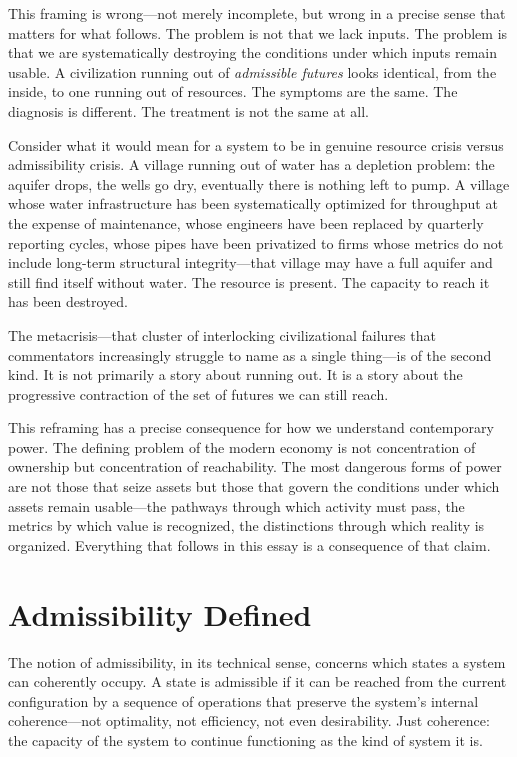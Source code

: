 \documentclass[11pt, letterpaper]{article}
\begin{document}
This framing is wrong---not merely incomplete, but wrong in a precise sense that matters for what follows. The problem is not that we lack inputs. The problem is that we are systematically destroying the conditions under which inputs remain usable. A civilization running out of \emph{admissible futures} looks identical, from the inside, to one running out of resources. The symptoms are the same. The diagnosis is different. The treatment is not the same at all.

Consider what it would mean for a system to be in genuine resource crisis versus admissibility crisis. A village running out of water has a depletion problem: the aquifer drops, the wells go dry, eventually there is nothing left to pump. A village whose water infrastructure has been systematically optimized for throughput at the expense of maintenance, whose engineers have been replaced by quarterly reporting cycles, whose pipes have been privatized to firms whose metrics do not include long-term structural integrity---that village may have a full aquifer and still find itself without water. The resource is present. The capacity to reach it has been destroyed.

The metacrisis---that cluster of interlocking civilizational failures that commentators increasingly struggle to name as a single thing---is of the second kind. It is not primarily a story about running out. It is a story about the progressive contraction of the set of futures we can still reach.

This reframing has a precise consequence for how we understand contemporary power. The defining problem of the modern economy is not concentration of ownership but concentration of reachability. The most dangerous forms of power are not those that seize assets but those that govern the conditions under which assets remain usable---the pathways through which activity must pass, the metrics by which value is recognized, the distinctions through which reality is organized. Everything that follows in this essay is a consequence of that claim.

\section{Admissibility Defined}

The notion of admissibility, in its technical sense, concerns which states a system can coherently occupy. A state is admissible if it can be reached from the current configuration by a sequence of operations that preserve the system's internal coherence---not optimality, not efficiency, not even desirability. Just coherence: the capacity of the system to continue functioning as the kind of system it is.
\end{document}
